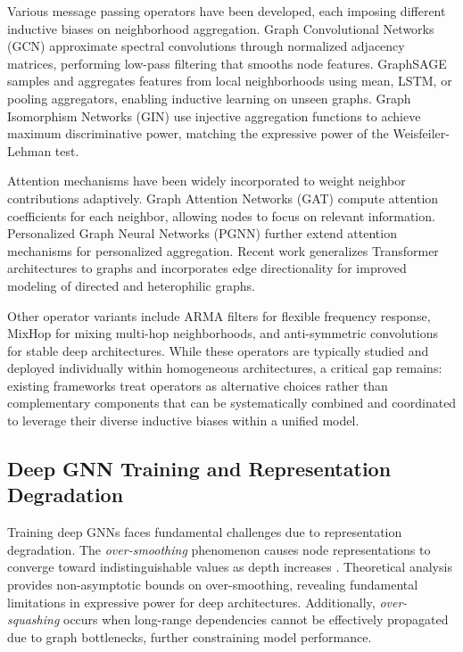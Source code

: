 Various message passing operators have been developed, each imposing different inductive biases on neighborhood aggregation. Graph Convolutional Networks (GCN) \cite{kipf2016semi} approximate spectral convolutions through normalized adjacency matrices, performing low-pass filtering that smooths node features. GraphSAGE \cite{hamilton2017inductive} samples and aggregates features from local neighborhoods using mean, LSTM, or pooling aggregators, enabling inductive learning on unseen graphs. Graph Isomorphism Networks (GIN) \cite{xu2018powerful} use injective aggregation functions to achieve maximum discriminative power, matching the expressive power of the Weisfeiler-Lehman test.

Attention mechanisms have been widely incorporated to weight neighbor contributions adaptively. Graph Attention Networks (GAT) \cite{velivckovic2017graph} compute attention coefficients for each neighbor, allowing nodes to focus on relevant information. Personalized Graph Neural Networks (PGNN) \cite{zhang2019personalized} further extend attention mechanisms for personalized aggregation. Recent work generalizes Transformer architectures to graphs \cite{dwivedi2020generalization} and incorporates edge directionality \cite{beaini2020directional, rossi2023edge} for improved modeling of directed and heterophilic graphs.

Other operator variants include ARMA filters \cite{bianchi2020graph} for flexible frequency response, MixHop \cite{abu2019mixhop} for mixing multi-hop neighborhoods, and anti-symmetric convolutions \cite{gravina2022anti} for stable deep architectures. While these operators are typically studied and deployed individually within homogeneous architectures, a critical gap remains: existing frameworks treat operators as alternative choices rather than complementary components that can be systematically combined and coordinated to leverage their diverse inductive biases within a unified model.

\subsection{Deep GNN Training and Representation Degradation}

Training deep GNNs faces fundamental challenges due to representation degradation. The \textit{over-smoothing} phenomenon causes node representations to converge toward indistinguishable values as depth increases \cite{li2018deeper, chen2023revisiting, li2023non}. Theoretical analysis \cite{li2023non} provides non-asymptotic bounds on over-smoothing, revealing fundamental limitations in expressive power for deep architectures. Additionally, \textit{over-squashing} \cite{topping2021understanding, alon2020bottleneck} occurs when long-range dependencies cannot be effectively propagated due to graph bottlenecks, further constraining model performance.

